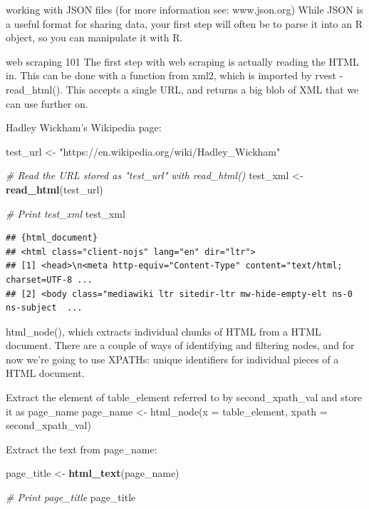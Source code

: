 \documentclass[]{book}
\newenvironment{Shaded}{\begin{snugshade}}{\end{snugshade}}
\newcommand{\CommentTok}[1]{\textcolor[rgb]{0.56,0.35,0.01}{\textit{#1}}}
\newcommand{\KeywordTok}[1]{\textcolor[rgb]{0.13,0.29,0.53}{\textbf{#1}}}
\newcommand{\NormalTok}[1]{#1}
\newcommand{\StringTok}[1]{\textcolor[rgb]{0.31,0.60,0.02}{#1}}
\begin{document}
working with JSON files (for more information see: www.json.org)
While JSON is a useful format for sharing data, your first step will often be to parse it into an R object, so you can manipulate it with R.

web scraping 101
The first step with web scraping is actually reading the HTML in.
This can be done with a function from xml2, which is imported by rvest - read\_html().
This accepts a single URL, and returns a big blob of XML that we can use further on.

Hadley Wickham's Wikipedia page:

\begin{Shaded}
\begin{Highlighting}[]
\NormalTok{test_url <-}\StringTok{ "https://en.wikipedia.org/wiki/Hadley_Wickham"}
  
\CommentTok{# Read the URL stored as "test_url" with read_html()}
\NormalTok{test_xml <-}\StringTok{ }\KeywordTok{read_html}\NormalTok{(test_url)}
  
\CommentTok{# Print test_xml}
\NormalTok{test_xml}
\end{Highlighting}
\end{Shaded}

\begin{verbatim}
## {html_document}
## <html class="client-nojs" lang="en" dir="ltr">
## [1] <head>\n<meta http-equiv="Content-Type" content="text/html; charset=UTF-8 ...
## [2] <body class="mediawiki ltr sitedir-ltr mw-hide-empty-elt ns-0 ns-subject  ...
\end{verbatim}

html\_node(), which extracts individual chunks of HTML from a HTML document.
There are a couple of ways of identifying and filtering nodes, and for now we're going to use XPATHs:
unique identifiers for individual pieces of a HTML document.

Extract the element of table\_element referred to by second\_xpath\_val and store it as page\_name
page\_name \textless{}- html\_node(x = table\_element, xpath = second\_xpath\_val)

Extract the text from page\_name:

\begin{Shaded}
\begin{Highlighting}[]
\NormalTok{page_title <-}\StringTok{ }\KeywordTok{html_text}\NormalTok{(page_name)}

\CommentTok{# Print page_title}
\NormalTok{page_title}
\end{Highlighting}
\end{Shaded}
\end{document}
